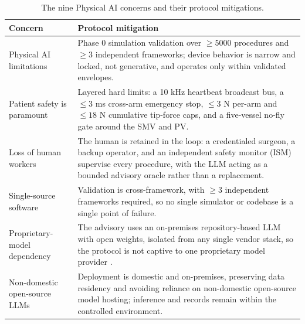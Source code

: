 \vspace{-0.7cm}

\vspace{0.3em}

\begin{table}[htbp]\centering\footnotesize
\caption{The nine Physical AI concerns and their protocol mitigations.}
\label{tab:concerns}
\begin{tabularx}{\textwidth}{L{5.5cm} Y}
\toprule
\textbf{Concern} & \textbf{Protocol mitigation} \\
\midrule
Physical AI limitations & Phase 0 simulation validation over $\geq 5000$ procedures and $\geq 3$ independent frameworks; device behavior is narrow and locked, not generative, and operates only within validated envelopes. \\
Patient safety is paramount & Layered hard limits: a 10 kHz heartbeat broadcast bus, a $\leq 3$ ms cross-arm emergency stop, $\leq 3$ N per-arm and $\leq 18$ N cumulative tip-force caps, and a five-vessel no-fly gate around the SMV and PV. \\
Loss of human workers & The human is retained in the loop: a credentialed surgeon, a backup operator, and an independent safety monitor (ISM) supervise every procedure, with the LLM acting as a bounded advisory oracle rather than a replacement. \\
Single-source software & Validation is cross-framework, with $\geq 3$ independent frameworks required, so no single simulator or codebase is a single point of failure. \\
Proprietary-model dependency & The advisory uses an on-premises repository-based LLM with open weights, isolated from any single vendor stack, so the protocol is not captive to one proprietary model provider \cite{kawchak2025codegen16}. \\
Non-domestic open-source LLMs & Deployment is domestic and on-premises, preserving data residency and avoiding reliance on non-domestic open-source model hosting; inference and records remain within the controlled environment. \\

\end{tabularx}
\end{table}
